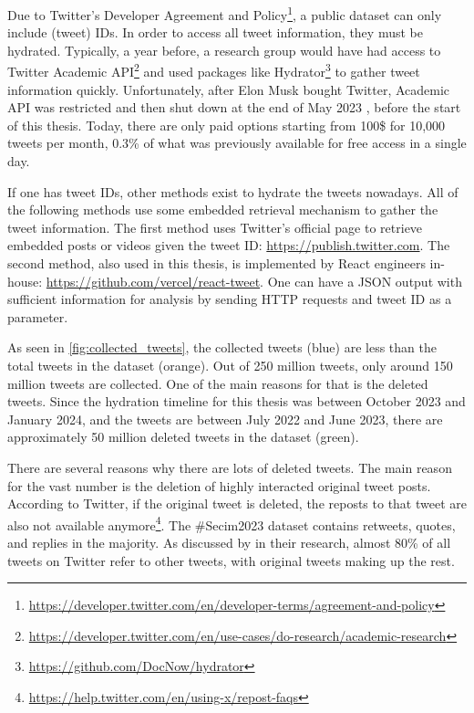 Due to Twitter's Developer Agreement and Policy\footnote{\url{https://developer.twitter.com/en/developer-terms/agreement-and-policy}}, 
a public dataset can only include (tweet) IDs. In order to access all tweet information,
they must be hydrated. Typically, a year before, a research group would have had access 
to Twitter Academic API\footnote{\url{https://developer.twitter.com/en/use-cases/do-research/academic-research}} 
and used packages like Hydrator\footnote{\url{https://github.com/DocNow/hydrator}} to gather 
tweet information quickly. Unfortunately, after Elon Musk bought Twitter, Academic API was 
restricted and then shut down at the end of May 2023 \parencite{calma_twitter_academicAPI_elon_2023},
before the start of this thesis. Today, there are only paid 
options starting from 100\$ for 10,000 tweets per month, 0.3\% of what was previously 
available for free access in a single day. 

If one has tweet IDs, other methods exist to hydrate the tweets nowadays. 
All of the following methods use some embedded retrieval mechanism to gather 
the tweet information. The first method uses Twitter's official page to 
retrieve embedded posts or videos given the tweet ID\@: \url{https://publish.twitter.com}. 
The second method, also used in this thesis, is implemented by React engineers in-house\@:
\url{https://github.com/vercel/react-tweet}. One can have a JSON output with sufficient 
information for analysis by sending HTTP requests and tweet ID as a parameter. 

As seen in \autoref{fig:collected_tweets}, the collected tweets (blue) are less than 
the total tweets in the dataset (orange). 
Out of 250 million tweets, only around 150 million tweets are collected.
One of the main reasons for that is the deleted 
tweets. Since the hydration timeline for this thesis was between October 2023 and January 2024, 
and the tweets are between July 2022 and June 2023, there are approximately 50 million 
deleted tweets in the dataset (green). 

There are several reasons why there are lots of deleted tweets. The main reason for the 
vast number is the deletion of highly interacted original tweet posts. According to Twitter, 
if the original tweet is deleted, the reposts to that tweet are also not available 
anymore\footnote{\url{https://help.twitter.com/en/using-x/repost-faqs}}. 
The \#Secim2023 dataset contains retweets, quotes, and replies in the majority.
As discussed by \textcite{pfeffer_twitter_24_Hours_just_another_day_2023} in their research, 
almost 80\% of all tweets on Twitter refer to other tweets, with original tweets making up the rest.

